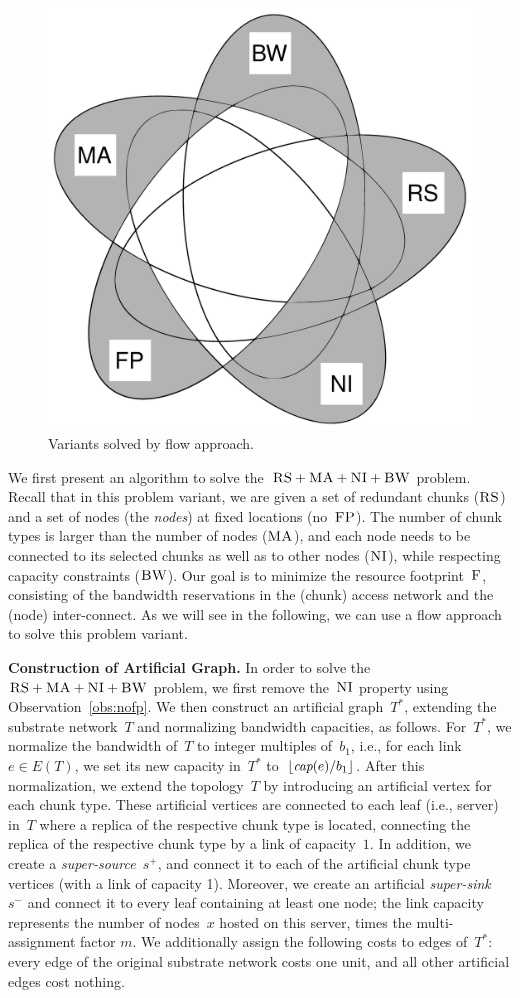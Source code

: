\documentclass[preprint,12pt]{elsarticle}
\newcommand{\MaFactor}{m}
\newcommand{\Source}{\ensuremath{s^{+}}}
\newcommand{\Sink}{\ensuremath{s^{-}}}
\newcommand{\capacity}{\emph{cap}}
\newcommand{\CC}{\textsc{NI}}
\newcommand{\FP}{\textsc{FP}}
\newcommand{\RS}{\textsc{RS}}
\newcommand{\BW}{\textsc{BW}}
\newcommand{\MA}{\textsc{MA}}
\newcommand{\Cost}{\textsc{F}}
\newcommand{\Tree}{\ensuremath{T}}
\newcommand{\CostTrans}{\ensuremath{b_1}}
\begin{document}
\begin{figure}[t]
\centering
\includegraphics[width=0.49\columnwidth]{figs/venn_flow.pdf}
\caption{Variants solved by flow approach.}
\vspace{-1em}
\label{fig:venn_flow}
\end{figure}


We first present an algorithm to solve the~$\RS+\MA+\CC+\BW$ problem.
Recall that in this problem variant,
we are given a set of redundant chunks ($\RS$) and a set of
nodes
(the \emph{nodes})
at fixed locations (no~$\FP$). The number of chunk types is larger than the number
of nodes ($\MA$), and each node needs to be connected
to its selected chunks as well as to other nodes ($\CC$), while respecting
capacity constraints ($\BW$).
Our goal is to minimize the resource footprint~$\Cost$, consisting
of the bandwidth reservations in the (chunk) access network and the (node)
inter-connect.
As we will see in the following, we can use a flow approach to solve this
problem variant.




\textbf{Construction of Artificial Graph.}
In order to solve the~$\RS+\MA+\CC+\BW$ problem,
we first remove the~$\CC$ property using Observation~\ref{obs:nofp}.
We then construct
an artificial graph~$\Tree^*$, extending the substrate network~$\Tree$ and
normalizing bandwidth capacities, as follows. For~$\Tree^*$,
we normalize the bandwidth of~$\Tree$ to integer multiples of~$\CostTrans$,
i.e., for each link~$e\in E(\Tree)$, we set its new
capacity in~$\Tree^*$ to~$\lfloor\capacity(e)/\CostTrans\rfloor$.
After this normalization, we extend the topology~$\Tree$ by
introducing an artificial vertex for each chunk type. These artificial
vertices are connected to each leaf (i.e., server) in~$\Tree$ where a replica
 of the respective chunk type is located,
connecting the replica of the respective chunk type by a link of capacity~$1$. In
addition, we create a
\emph{super-source}~$\Source$, and connect it to each of the artificial chunk
type vertices (with a link of capacity 1). Moreover, we create an artificial \emph{super-sink}~$\Sink$ and
connect it to every leaf containing at least one node; the link capacity represents
the number of nodes~$x$ hosted on this server, times the multi-assignment factor
$\MaFactor$.
We additionally assign the following costs to edges of~$\Tree^*$:
every edge of the original substrate network costs one unit, and all other artificial edges
cost nothing.
\end{document}
